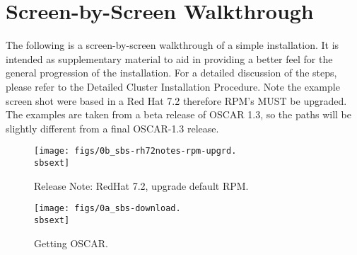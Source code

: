 %
%
%

\newpage

\section{Screen-by-Screen Walkthrough}
\label{app:screen-by-screen}

The following is a screen-by-screen walkthrough of a simple installation.
It is intended as supplementary material to aid in providing a better feel
for the general progression of the installation.  For a detailed discussion
of the steps, please refer to the Detailed Cluster Installation Procedure. 
\begchange
Note the example screen shot were based in a Red Hat 7.2 therefore RPM's MUST be upgraded. The examples are taken from a beta release of OSCAR 1.3, so the paths will be slightly different from a final OSCAR-1.3 release.
\endchange

\setlength{\oddsidemargin}{-0.5in}
\setlength{\evensidemargin}{-0.5in}
\setlength{\textwidth}{7.5in}

\begin{figure}[htbp]
  \begin{center}
    \texttt{[image: figs/0b\_sbs-rh72notes-rpm-upgrd.\\sbsext]}
    \caption{Release Note: RedHat 7.2, upgrade default RPM.}
    \label{fig:sbs-rh72notes-rpm-upgrd}
  \end{center}
\end{figure}


\begin{figure}[htbp]
  \begin{center}
    \texttt{[image: figs/0a\_sbs-download.\\sbsext]}
    \caption{Getting OSCAR.}
    \label{fig:sbs-getting-oscar}
  \end{center}
\end{figure}


